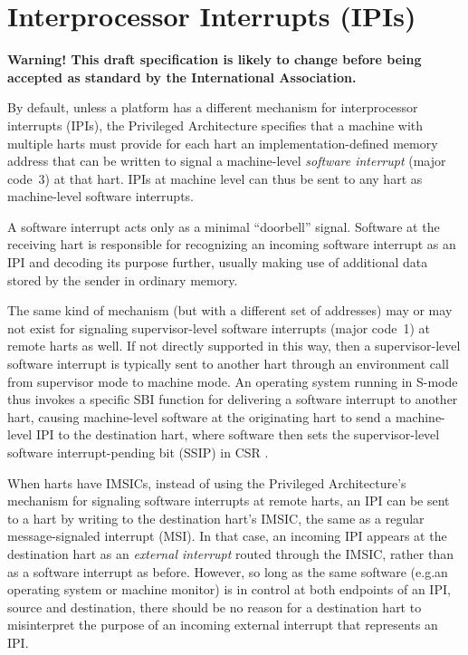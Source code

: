 
\chapter{Interprocessor Interrupts (IPIs)}
\label{ch:IPIs}

\textbf{%
Warning!
This draft specification is likely to change before being accepted as
standard by the {\RISCV} International Association.%
}
\bigskip

By default, unless a platform has a different mechanism for
interprocessor interrupts (IPIs), the {\RISCV} Privileged Architecture
specifies that a machine with multiple harts must provide for each hart
an implementation-defined memory address that can be written to signal
a machine-level \emph{software interrupt} (major code~3) at that hart.
IPIs at machine level can thus be sent to any hart as machine-level
software interrupts.

\begin{commentary}
A {\RISCV} software interrupt acts only as a minimal ``doorbell''
signal.
Software at the receiving hart is responsible for recognizing an
incoming software interrupt as an IPI and decoding its purpose further,
usually making use of additional data stored by the sender in ordinary
memory.
\end{commentary}

The same kind of mechanism (but with a different set of addresses) may
or may not exist for signaling supervisor-level software interrupts
(major code~1) at remote harts as well.
If not directly supported in this way, then a supervisor-level software
interrupt is typically sent to another hart through an environment call
from supervisor mode to machine mode.
An operating system running in \mbox{S-mode} thus invokes a specific
SBI function for delivering a software interrupt to another hart,
causing machine-level software at the originating hart to send a
machine-level IPI to the destination hart, where software then sets the
supervisor-level software interrupt-pending bit (SSIP) in CSR .

When harts have IMSICs, instead of using the Privileged Architecture's
mechanism for signaling software interrupts at remote harts, an IPI
can be sent to a hart by writing to the destination hart's IMSIC, the
same as a regular message-signaled interrupt (MSI)\@.
In that case, an incoming IPI appears at the destination hart as an
\emph{external interrupt} routed through the IMSIC, rather than as a
software interrupt as before.
However, so long as the same software (e.g.\@ an operating system or
machine monitor) is in control at both endpoints of an IPI, source
and destination, there should be no reason for a destination hart
to misinterpret the purpose of an incoming external interrupt that
represents an IPI.

